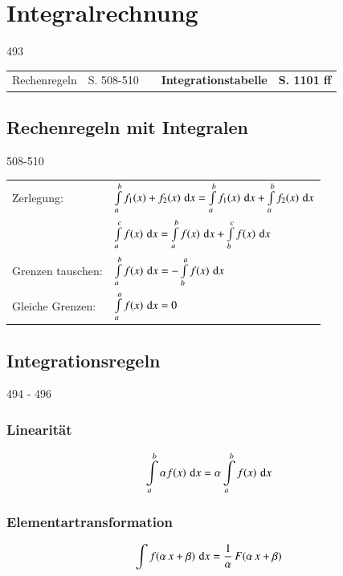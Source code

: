 \section{Integralrechnung}{493}

\begin{tabular}{ll c ll} 
    Rechenregeln    & S. 508-510    & & \textbf{Integrationstabelle}    & \textbf{S. 1101 ff} 
\end{tabular}
        

\subsection{Rechenregeln mit Integralen}{508-510}

\renewcommand{\arraystretch}{2.3}
\begin{tabular}{ll}
    Zerlegung:          & $\int \limits_{a}^{b} f_1(x) + f_2(x) \, \mathop{} \! \mathrm{d} x 
                        = \int \limits_{a}^{b} f_1(x) \, \mathop{} \! \mathrm{d} x + \int \limits_{a}^{b} f_2(x) \, \mathop{} \! \mathrm{d} x$                                      \\
                        & $\int \limits_{a}^{c} f(x) \, \mathop{} \! \mathrm{d} x = \int \limits_{a}^{b} f(x) \, \mathop{} \! \mathrm{d} x + \int \limits_{b}^{c} f(x) \, \mathop{} \! \mathrm{d} x$  \\
    Grenzen tauschen:   & $ \int \limits_{a}^{b} f(x) \, \mathop{} \! \mathrm{d} x = -  \int \limits_{b}^{a} f(x) \, \mathop{} \! \mathrm{d} x $                                    \\
    Gleiche Grenzen:    & $\int \limits_{a}^{a} f(x) \, \mathop{} \! \mathrm{d} x = 0$
\end{tabular}		
\renewcommand{\arraystretch}{1}

\subsection{Integrationsregeln}{494 - 496}

\vspace{-0.2cm}

\begin{minipage}[t]{0.4\columnwidth}
    \subsubsection{Linearität}

    \vspace{-0.5cm}

    $$ \int \limits_{a}^{b} \alpha f(x) \, \mathop{} \! \mathrm{d} x = \alpha \int \limits_{a}^{b} f(x) \, \mathop{} \! \mathrm{d} x $$
\end{minipage}
\hfill
\begin{minipage}[t]{0.58\columnwidth}
    \subsubsection{Elementartransformation}

    $$ \int f(\alpha \, x + \beta) \, \mathop{} \! \mathrm{d} x = \frac{1}{\alpha} \, F(\alpha \, x + \beta) $$
\end{minipage}


